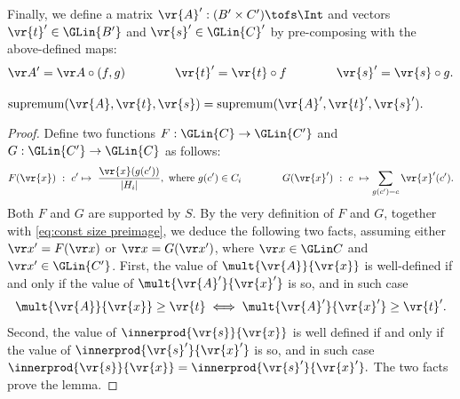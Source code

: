Finally, we
define a matrix $\vr{A}' : (B' \times C') \tofs \Int$ and vectors $\vr{t}' \in \GLin {B'}$ and
$\vr{s}' \in \GLin{C}'$ by pre-composing with the above-defined maps:
\begin{align} \label{eq:precom}
\vr A' = \vr A \circ (f, g) 
\qquad\qquad
\vr{t}'      = \vr{t} \circ f  \qquad\qquad
\vr{s}'      = \vr{s} \circ g.
\end{align}
%
%
\begin{lemma}\label{lem:canon S supp}
$
\textnormal{supremum}(\vr{A},\vr{t},\vr{s}) =
\textnormal{supremum}(\vr{A}',\vr{t}',\vr{s}').
$
\end{lemma}
%
\begin{proof}
Define two functions $F : \GLin{C} \to \GLin{C'}$ and $G : \GLin{C'} \to \GLin{C}$ as follows:
\begin{align*}
F(\vr{x}) \  : \  c' \mapsto\  \frac {\vr{x}(g(c'))} {|H_i|}, \text{ where }g(c') \in C_i 
\qquad\qquad
G(\vr{x}') \  : \ c\ \mapsto \sum_{g(c') = c} \vr{x}'(c').
\end{align*}
%
%
%
Both $F$ and $G$ are supported by $S$.
By the very definition of $F$ and $G$, together with \eqref{eq:const size preimage}, we deduce
the following two facts, assuming either
$\vr x' = F(\vr x)$ or $\vr x = G(\vr x')$, where $\vr x\in \GLin C$ and $\vr x' \in \GLin{C'}$.
First,
the value of $\mult {\vr{A}}  {\vr{x}}$ is well-defined if and only if
the value of $\mult{\vr{A}'} {\vr{x}'}$ is so, and in such case
%
\[
\mult {\vr{A}}  {\vr{x}} \geq \vr{t} \iff
\mult{\vr{A}'} {\vr{x}'} \geq \vr{t}'.
\]
Second,
the value of $\innerprod {\vr{s}}  {\vr{x}}$ is well defined if and only if 
the value of $\innerprod {\vr{s}'} {\vr{x}'}$ is so, and in such case
$
\innerprod {\vr{s}}  {\vr{x}} = \innerprod {\vr{s}'} {\vr{x}'}.
$
The two facts prove the lemma.
%
%
%
%
%
\end{proof}

